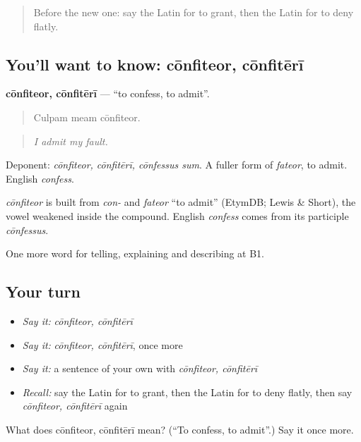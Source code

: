\begin{quote}
Before the new one: say the Latin for to grant, then the Latin for to deny flatly.
\end{quote}

\subsection*{You'll want to know: cōnfiteor, cōnfitērī}
\textbf{cōnfiteor, cōnfitērī} — \textquotedblleft{}to confess, to admit\textquotedblright{}.

\begin{quote}
Culpam meam cōnfiteor.
\end{quote}

\begin{quote}
\emph{I admit my fault.}
\end{quote}

Deponent: \emph{cōnfiteor, cōnfitērī, cōnfessus sum}. A fuller form of \emph{fateor}, to admit. English \emph{confess}.

\begin{cousinweb}
\emph{cōnfiteor} is built from \emph{con-} and \emph{fateor} \textquotedblleft{}to admit\textquotedblright{} (EtymDB; Lewis \& Short), the vowel weakened inside the compound. English \emph{confess} comes from its participle \emph{cōnfessus}.
\end{cousinweb}

\begin{grammarlens}[title={What you've built}]
One more word for telling, explaining and describing at B1.
\end{grammarlens}

\subsection*{Your turn}
\begin{itemize}
\raggedright
  \item \emph{Say it:} \emph{cōnfiteor, cōnfitērī}
  \item \emph{Say it:} \emph{cōnfiteor, cōnfitērī}, once more
  \item \emph{Say it:} a sentence of your own with \emph{cōnfiteor, cōnfitērī}
  \item \emph{Recall:} say the Latin for to grant, then the Latin for to deny flatly, then say \emph{cōnfiteor, cōnfitērī} again
\end{itemize}

\begin{tcolorbox}[breakable,colback=teal!4,colframe=teal!35!black,title={Before you move on}]
What does cōnfiteor, cōnfitērī mean? (\textquotedblleft{}To confess, to admit\textquotedblright{}.) Say it once more.
\end{tcolorbox}
